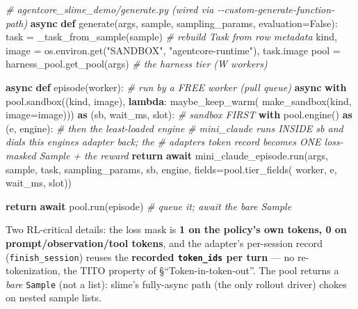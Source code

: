 \documentclass[
  paper=a4,
  ,captions=tableheading
]{scrartcl}
\newenvironment{Shaded}{}{}
\newcommand{\CommentTok}[1]{\textcolor[rgb]{0.38,0.63,0.69}{\textit{#1}}}
\newcommand{\ControlFlowTok}[1]{\textcolor[rgb]{0.00,0.44,0.13}{\textbf{#1}}}
\newcommand{\ImportTok}[1]{\textcolor[rgb]{0.00,0.50,0.00}{\textbf{#1}}}
\newcommand{\KeywordTok}[1]{\textcolor[rgb]{0.00,0.44,0.13}{\textbf{#1}}}
\newcommand{\NormalTok}[1]{#1}
\newcommand{\OperatorTok}[1]{\textcolor[rgb]{0.40,0.40,0.40}{#1}}
\newcommand{\StringTok}[1]{\textcolor[rgb]{0.25,0.44,0.63}{#1}}
\newcommand{\VariableTok}[1]{\textcolor[rgb]{0.10,0.09,0.49}{#1}}
\begin{document}
\begin{Shaded}
\begin{Highlighting}[]
\CommentTok{\# agentcore\_slime\_demo/generate.py  (wired via {-}{-}custom{-}generate{-}function{-}path)}
\ControlFlowTok{async} \KeywordTok{def}\NormalTok{ generate(args, sample, sampling\_params, evaluation}\OperatorTok{=}\VariableTok{False}\NormalTok{):}
\NormalTok{    task }\OperatorTok{=}\NormalTok{ \_task\_from\_sample(sample)                        }\CommentTok{\# rebuild Task from row metadata}
\NormalTok{    kind, image }\OperatorTok{=}\NormalTok{ os.environ.get(}\StringTok{"SANDBOX"}\NormalTok{, }\StringTok{"agentcore{-}runtime"}\NormalTok{), task.image}
\NormalTok{    pool }\OperatorTok{=}\NormalTok{ harness\_pool.get\_pool(args)                      }\CommentTok{\# the harness tier (W workers)}

    \ControlFlowTok{async} \KeywordTok{def}\NormalTok{ episode(worker):                              }\CommentTok{\# run by a FREE worker (pull queue)}
        \ControlFlowTok{async} \ControlFlowTok{with}\NormalTok{ pool.sandbox((kind, image), }\KeywordTok{lambda}\NormalTok{: maybe\_keep\_warm(}
\NormalTok{                make\_sandbox(kind, image}\OperatorTok{=}\NormalTok{image))) }\ImportTok{as}\NormalTok{ (sb, wait\_ms, slot):  }\CommentTok{\# sandbox FIRST}
            \ControlFlowTok{with}\NormalTok{ pool.engine() }\ImportTok{as}\NormalTok{ (e, engine):              }\CommentTok{\# then the least{-}loaded engine}
                \CommentTok{\# mini\_claude runs INSIDE sb and dials this engine\textquotesingle{}s adapter back; the}
                \CommentTok{\# adapter\textquotesingle{}s token record becomes ONE loss{-}masked Sample + the reward}
                \ControlFlowTok{return} \ControlFlowTok{await}\NormalTok{ mini\_claude\_episode.run(args, sample, task, sampling\_params,}
\NormalTok{                                                     sb, engine, fields}\OperatorTok{=}\NormalTok{pool.tier\_fields(}
\NormalTok{                                                         worker, e, wait\_ms, slot))}

    \ControlFlowTok{return} \ControlFlowTok{await}\NormalTok{ pool.run(episode)                          }\CommentTok{\# queue it; await the bare Sample}
\end{Highlighting}
\end{Shaded}

Two RL-critical details: the loss mask is \textbf{1 on the policy's own
tokens, 0 on prompt/observation/tool tokens}, and the adapter's
per-session record (\texttt{finish\_session}) reuses the
\textbf{recorded \texttt{token\_ids} per turn} --- no re-tokenization,
the TITO property of §``Token-in-token-out''. The pool returns a
\emph{bare} \texttt{Sample} (not a list): slime's fully-async path (the
only rollout driver) chokes on nested sample lists.
\end{document}
